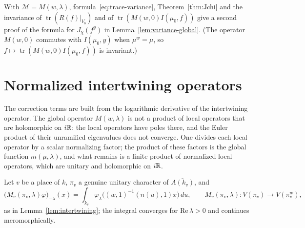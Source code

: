 With $\mathcal M=M(w,\lambda)$, formula~\eqref{eq:trace-variance},
Theorem~\ref{thm:Jchi} and the invariance of $\operatorname{tr}(R(f)|_{V_b})$
and of $\operatorname{tr}(M(w,0)I(\mu_0,f))$ give a second proof of the
formula for $J_\chi(f^y)$ in Lemma~\ref{lem:variance-global}. (The
operator $M(w,0)$ commutes with $I(\mu_0,y)$ when $\mu^w=\mu$, so
$f\mapsto\operatorname{tr}(M(w,0)I(\mu_0,f))$ is invariant.)

\section{Normalized intertwining operators}\label{sec:normalized}

The correction terms are built from the logarithmic derivative of the
intertwining operator. The global operator $M(w,\lambda)$ is not a
product of local operators that are holomorphic on $i\mathbb{R}$: the local
operators have poles there, and the Euler product of their unramified
eigenvalues does not converge. One divides each local operator by a
scalar normalizing factor; the product of these factors is the global
function $m(\mu,\lambda)$, and what remains is a finite product of
normalized local operators, which are unitary and holomorphic on $i\mathbb{R}$.

Let $v$ be a place of $k$, $\pi_v$ a genuine unitary character of
$\overline{A(k_v)}$, and
\[
\bigl(M_v(\pi_v,\lambda)\varphi\bigr)_{-\lambda}(x)=\int_{k_v}
\varphi_\lambda\bigl((w,1)^{-1}(n(u),1)x\bigr)\,du,\qquad
M_v(\pi_v,\lambda)\colon V(\pi_v)\to V(\pi_v^w),
\]
as in Lemma~\ref{lem:intertwining}; the integral converges for
$\mathrm{Re}\,\lambda>0$ and continues meromorphically.

